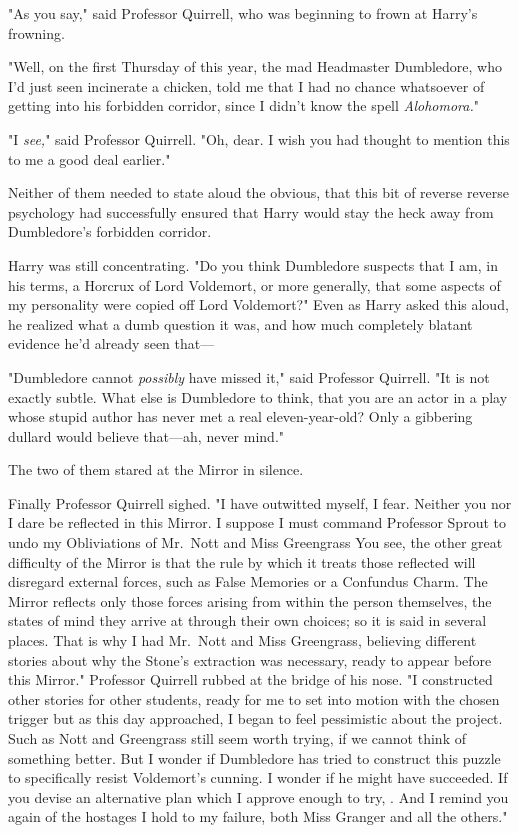 "As you say," said Professor Quirrell, who was beginning to frown at Harry's
frowning.

"Well, on the first Thursday of this year, the mad Headmaster Dumbledore, who
I'd just seen incinerate a chicken, told me that I had no chance whatsoever of
getting into his forbidden corridor, since I didn't know the spell
\emph{Alohomora.}"

"I \emph{see,}" said Professor Quirrell. "Oh, dear. I wish you had thought to
mention this to me a good deal earlier."

Neither of them needed to state aloud the obvious, that this bit of reverse
reverse psychology had successfully ensured that Harry would stay the heck away
from Dumbledore's forbidden corridor.

Harry was still concentrating. "Do you think Dumbledore suspects that I am, in
his terms, a Horcrux of Lord Voldemort, or more generally, that some aspects of
my personality were copied off Lord Voldemort?" Even as Harry asked this aloud,
he realized what a dumb question it was, and how much completely blatant
evidence he'd already seen that---

"Dumbledore cannot \emph{possibly} have missed it," said Professor Quirrell.
"It is not exactly subtle. What else is Dumbledore to think, that you are an
actor in a play whose stupid author has never met a real eleven-year-old? Only
a gibbering dullard would believe that---ah, never mind."

The two of them stared at the Mirror in silence.

Finally Professor Quirrell sighed. "I have outwitted myself, I fear. Neither
you nor I dare be reflected in this Mirror. I suppose I must command Professor
Sprout to undo my Obliviations of Mr.~Nott and Miss Greengrass{\el} You see,
the other great difficulty of the Mirror is that the rule by which it treats
those reflected will disregard external forces, such as False Memories or a
Confundus Charm. The Mirror reflects only those forces arising from within the
person themselves, the states of mind they arrive at through their own choices;
so it is said in several places. That is why I had Mr.~Nott and Miss
Greengrass, believing different stories about why the Stone's extraction was
necessary, ready to appear before this Mirror." Professor Quirrell rubbed at
the bridge of his nose. "I constructed other stories for other students, ready
for me to set into motion with the chosen trigger{\el} but as this day
approached, I began to feel pessimistic about the project. Such as Nott and
Greengrass still seem worth trying, if we cannot think of something better. But
I wonder if Dumbledore has tried to construct this puzzle to specifically
resist Voldemort's cunning. I wonder if he might have succeeded. If you devise
an alternative plan which I approve enough to try, . And I remind you again of the hostages I hold
to my failure, both Miss Granger and all the others."

